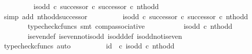\begin{isabellebody}
\ \ \ \ \isamarkupfalse%
\ \isamarkupfalse%
\ {\isachardoublequoteopen}{\isachardot}{\kern0pt}{\isachardot}{\kern0pt}{\isachardot}{\kern0pt}\ {\isacharequal}{\kern0pt}\ is{\isacharunderscore}{\kern0pt}odd\ {\isasymcirc}\isactrlsub c\ successor\ {\isasymcirc}\isactrlsub c\ successor\ {\isasymcirc}\isactrlsub c\ nth{\isacharunderscore}{\kern0pt}odd{\isachardoublequoteclose}\isanewline
\ \ \ \ \ \ \isamarkupfalse%
\ {\isacharparenleft}{\kern0pt}simp\ add{\isacharcolon}{\kern0pt}\ nth{\isacharunderscore}{\kern0pt}odd{\isacharunderscore}{\kern0pt}successor{}{\isacharparenright}{\kern0pt}\isanewline
\ \ \ \ \isamarkupfalse%
\ \isamarkupfalse%
\ {\isachardoublequoteopen}{\isachardot}{\kern0pt}{\isachardot}{\kern0pt}{\isachardot}{\kern0pt}\ {\isacharequal}{\kern0pt}\ {\isacharparenleft}{\kern0pt}{\isacharparenleft}{\kern0pt}is{\isacharunderscore}{\kern0pt}odd\ {\isasymcirc}\isactrlsub c\ successor{\isacharparenright}{\kern0pt}\ {\isasymcirc}\isactrlsub c\ successor{\isacharparenright}{\kern0pt}\ {\isasymcirc}\isactrlsub c\ nth{\isacharunderscore}{\kern0pt}odd{\isachardoublequoteclose}\isanewline
\ \ \ \ \ \ \isamarkupfalse%
\ {\isacharparenleft}{\kern0pt}typecheck{\isacharunderscore}{\kern0pt}cfuncs{\isacharcomma}{\kern0pt}\ smt\ comp{\isacharunderscore}{\kern0pt}associative{}{\isacharparenright}{\kern0pt}\isanewline
\ \ \ \ \isamarkupfalse%
\ \isamarkupfalse%
\ {\isachardoublequoteopen}{\isachardot}{\kern0pt}{\isachardot}{\kern0pt}{\isachardot}{\kern0pt}\ {\isacharequal}{\kern0pt}\ \ is{\isacharunderscore}{\kern0pt}odd\ {\isasymcirc}\isactrlsub c\ nth{\isacharunderscore}{\kern0pt}odd{\isachardoublequoteclose}\isanewline
\ \ \ \ \ \ \isamarkupfalse%
\ is{\isacharunderscore}{\kern0pt}even{\isacharunderscore}{\kern0pt}def{}\ is{\isacharunderscore}{\kern0pt}even{\isacharunderscore}{\kern0pt}not{\isacharunderscore}{\kern0pt}is{\isacharunderscore}{\kern0pt}odd\ is{\isacharunderscore}{\kern0pt}odd{\isacharunderscore}{\kern0pt}def{}\ is{\isacharunderscore}{\kern0pt}odd{\isacharunderscore}{\kern0pt}not{\isacharunderscore}{\kern0pt}is{\isacharunderscore}{\kern0pt}even\ \isamarkupfalse%
\ {\isacharparenleft}{\kern0pt}typecheck{\isacharunderscore}{\kern0pt}cfuncs{\isacharcomma}{\kern0pt}\ auto{\isacharparenright}{\kern0pt}\isanewline
\ \ \ \ \isamarkupfalse%
\ \isamarkupfalse%
\ {\isachardoublequoteopen}{\isachardot}{\kern0pt}{\isachardot}{\kern0pt}{\isachardot}{\kern0pt}\ {\isacharequal}{\kern0pt}\ id\ {\isasymOmega}\ {\isasymcirc}\isactrlsub c\ is{\isacharunderscore}{\kern0pt}odd\ {\isasymcirc}\isactrlsub c\ nth{\isacharunderscore}{\kern0pt}odd{\isachardoublequoteclose}\isanewline

\end{isabellebody}
